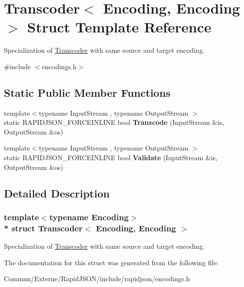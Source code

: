 \hypertarget{struct_transcoder_3_01_encoding_00_01_encoding_01_4}{}\section{Transcoder$<$ Encoding, Encoding $>$ Struct Template Reference}
\label{struct_transcoder_3_01_encoding_00_01_encoding_01_4}


Specialization of \hyperlink{struct_transcoder}{Transcoder} with same source and target encoding.  




{\ttfamily \#include $<$encodings.\+h$>$}

\subsection*{Static Public Member Functions}
\begin{DoxyCompactItemize}
\item 
{\footnotesize template$<$typename Input\+Stream , typename Output\+Stream $>$ }\\static R\+A\+P\+I\+D\+J\+S\+O\+N\+\_\+\+F\+O\+R\+C\+E\+I\+N\+L\+I\+NE bool {\bfseries Transcode} (Input\+Stream \&is, Output\+Stream \&os)\hypertarget{struct_transcoder_3_01_encoding_00_01_encoding_01_4_aad11cdc2b829123a7b9969e34d456813}{}\label{struct_transcoder_3_01_encoding_00_01_encoding_01_4_aad11cdc2b829123a7b9969e34d456813}

\item 
{\footnotesize template$<$typename Input\+Stream , typename Output\+Stream $>$ }\\static R\+A\+P\+I\+D\+J\+S\+O\+N\+\_\+\+F\+O\+R\+C\+E\+I\+N\+L\+I\+NE bool {\bfseries Validate} (Input\+Stream \&is, Output\+Stream \&os)\hypertarget{struct_transcoder_3_01_encoding_00_01_encoding_01_4_a536aa3930251161d05e112947ec2f9c8}{}\label{struct_transcoder_3_01_encoding_00_01_encoding_01_4_a536aa3930251161d05e112947ec2f9c8}

\end{DoxyCompactItemize}


\subsection{Detailed Description}
\subsubsection*{template$<$typename Encoding$>$\\*
struct Transcoder$<$ Encoding, Encoding $>$}

Specialization of \hyperlink{struct_transcoder}{Transcoder} with same source and target encoding. 

The documentation for this struct was generated from the following file\+:\begin{DoxyCompactItemize}
\item 
Commun/\+Externe/\+Rapid\+J\+S\+O\+N/include/rapidjson/encodings.\+h\end{DoxyCompactItemize}
